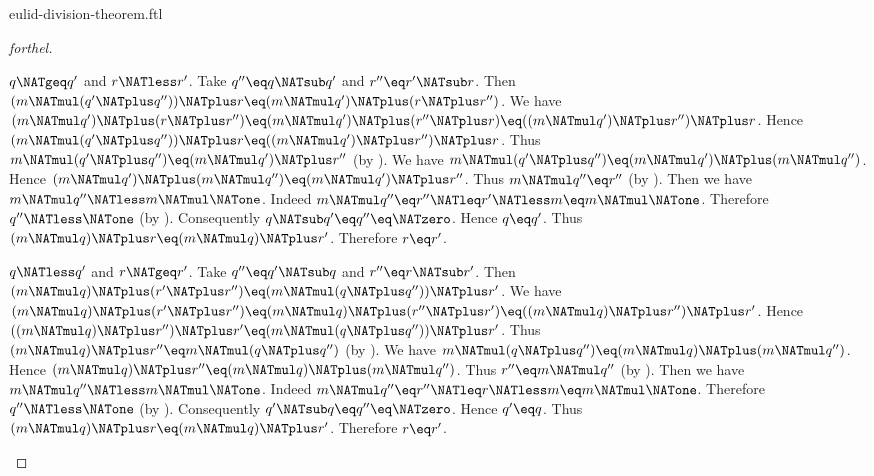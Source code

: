 \documentclass{naproche-library}
\begin{document}
\begin{smodule}[title=Euclid's Division Theorem]{eulid-division-theorem.ftl}
\begin{proof}[forthel]
  \begin{case}{$q \NATgeq q'$ and $r \NATless r'$.}
    Take $q'' \eq q \NATsub q'$ and $r'' \eq r' \NATsub r$.
    Then $(m \NATmul (q' \NATplus q'')) \NATplus r \eq (m \NATmul q') \NATplus (r \NATplus r'')$.
    We have $(m \NATmul q') \NATplus (r \NATplus r'')
      \eq (m \NATmul q') \NATplus (r'' \NATplus r)
      \eq ((m \NATmul q') \NATplus r'') \NATplus r$.
    Hence $(m \NATmul (q' \NATplus q'')) \NATplus r \eq ((m \NATmul q') \NATplus r'') \NATplus r$.
    Thus $m \NATmul (q' \NATplus q'') \eq (m \NATmul q') \NATplus r''$ (by ).
    We have $m \NATmul (q' \NATplus q'') \eq (m \NATmul q') \NATplus (m \NATmul q'')$.
    Hence $(m \NATmul q') \NATplus (m \NATmul q'') \eq (m \NATmul q') \NATplus r''$.
    Thus $m \NATmul q'' \eq r''$ (by ).
    Then we have $m \NATmul q'' \NATless m \NATmul \NATone$.
    Indeed $m \NATmul q''
      \eq r''
      \NATleq r'
      \NATless m
      \eq m \NATmul \NATone$.
    Therefore $q'' \NATless \NATone$ (by ).
    Consequently $q \NATsub q' \eq q'' \eq \NATzero$.
    Hence $q \eq q'$.
    Thus $(m \NATmul q) \NATplus r \eq (m \NATmul q) \NATplus r'$.
    Therefore $r \eq r'$.
  \end{case}

  \begin{case}{$q \NATless q'$ and $r \NATgeq r'$.}
    Take $q'' \eq q' \NATsub q$ and $r'' \eq r \NATsub r'$.
    Then $(m \NATmul q) \NATplus (r' \NATplus r'') \eq (m \NATmul (q \NATplus q'')) \NATplus r'$.
    We have $(m \NATmul q) \NATplus (r' \NATplus r'')
      \eq (m \NATmul q) \NATplus (r'' \NATplus r')
      \eq ((m \NATmul q) \NATplus r'') \NATplus r'$.
    Hence $((m \NATmul q) \NATplus r'') \NATplus r' \eq (m \NATmul (q \NATplus q'')) \NATplus r'$.
    Thus $(m \NATmul q) \NATplus r'' \eq m \NATmul (q \NATplus q'')$ (by ).
    We have $m \NATmul (q \NATplus q'') \eq (m \NATmul q) \NATplus (m \NATmul q'')$.
    Hence $(m \NATmul q) \NATplus r'' \eq (m \NATmul q) \NATplus (m \NATmul q'')$.
    Thus $r'' \eq m \NATmul q''$ (by ).
    Then we have $m \NATmul q'' \NATless m \NATmul \NATone$.
    Indeed $m \NATmul q''
      \eq r''
      \NATleq r
      \NATless m
      \eq m \NATmul \NATone$.
    Therefore $q'' \NATless \NATone$ (by ).
    Consequently $q' \NATsub q \eq q'' \eq \NATzero$.
    Hence $q' \eq q$.
    Thus $(m \NATmul q) \NATplus r \eq (m \NATmul q) \NATplus r'$.
    Therefore $r \eq r'$.
  \end{case}


\end{proof}
\end{smodule}
\end{document}
